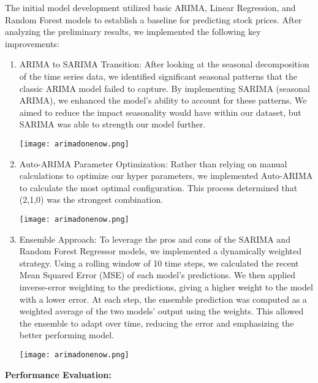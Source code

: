 \documentclass[conference]{IEEEtran}
\begin{document}
The initial model development utilized basic ARIMA, Linear Regression, and Random Forest models to establish a baseline for predicting stock prices. After analyzing the preliminary results, we implemented the following key improvements:

\begin{enumerate}
    \item ARIMA to SARIMA Transition: After looking at the seasonal decomposition of the time series data, we identified significant seasonal patterns that the classic ARIMA model failed to capture. By implementing SARIMA (seasonal ARIMA), we enhanced the model’s ability to account for these patterns. We aimed to reduce the impact seasonality would have within our dataset, but SARIMA was able to strength our model further.
    
    \texttt{[image: arimadonenow.png]} %

    \item Auto-ARIMA Parameter Optimization: Rather than relying on manual calculations to optimize our hyper parameters, we implemented Auto-ARIMA to calculate the most optimal configuration. This process determined that (2,1,0) was the strongest combination.
    
    \texttt{[image: arimadonenow.png]} %

    \item Ensemble Approach: To leverage the pros and cons of the SARIMA and Random Forest Regressor models, we implemented a dynamically weighted strategy. Using a rolling window of 10 time steps, we calculated the recent Mean Squared Error (MSE) of each model’s predictions. We then applied inverse-error weighting to the predictions, giving a higher weight to the model with a lower error. At each step, the ensemble prediction was computed as a weighted average of the two models’ output using the weights. This allowed the ensemble to adapt over time, reducing the error and emphasizing the better performing model.
    
    \texttt{[image: arimadonenow.png]} %

\end{enumerate}


\textbf{Performance Evaluation:}
\end{document}
